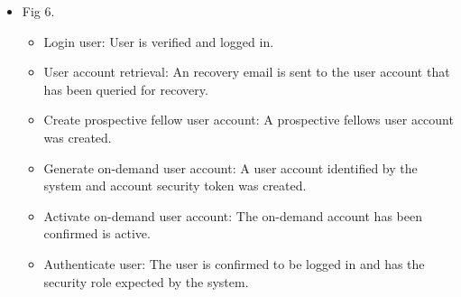 \documentclass[12pt]{article}
\begin{document}
\begin{itemize}
	\item Fig 6.
		\begin{itemize}
			\item Login user: User is verified and logged in.
			\item User account retrieval: An recovery email is sent to the user account that has been queried for recovery.				
			\item Create prospective fellow user account: A prospective fellows user account was created.
			\item Generate on-demand user account: A user account identified by the system and account security token was created.
			\item Activate on-demand user account: The on-demand account has been confirmed is active.
			\item Authenticate user: The user is confirmed to be logged in and has the security role expected by the system.						
		\end{itemize}
		

\end{itemize}
\end{document}
